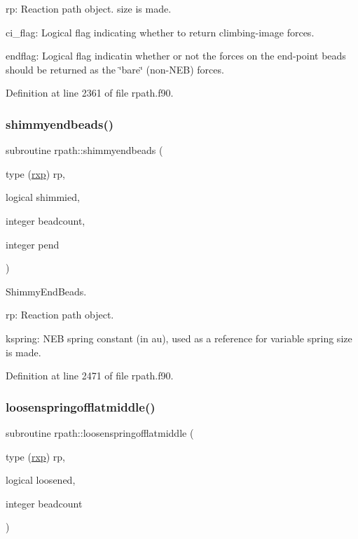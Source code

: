 \begin{DoxyItemize}
\item rp\+: Reaction path object. size is made.
\item ci\+\_\+flag\+: Logical flag indicating whether to return climbing-\/image forces.
\item endflag\+: Logical flag indicatin whether or not the forces on the end-\/point beads should be returned as the \char`\"{}bare\char`\"{} (non-\/\+N\+EB) forces. 
\end{DoxyItemize}

Definition at line 2361 of file rpath.\+f90.

\mbox{\label{namespacerpath_aae808f74fd2e658a175c79600c5bfe34}} 
\subsubsection{\texorpdfstring{shimmyendbeads()}{shimmyendbeads()}}
{\footnotesize\ttfamily subroutine rpath\+::shimmyendbeads (\begin{DoxyParamCaption}\item[{type (\mbox{\hyperlink{structrpath_1_1rxp}{rxp}})}]{rp,  }\item[{logical}]{shimmied,  }\item[{integer}]{beadcount,  }\item[{integer}]{pend }\end{DoxyParamCaption})}



Shimmy\+End\+Beads. 


\begin{DoxyItemize}
\item rp\+: Reaction path object.
\item kspring\+: N\+EB spring constant (in au), used as a reference for variable spring size is made. 
\end{DoxyItemize}

Definition at line 2471 of file rpath.\+f90.

\mbox{\label{namespacerpath_ae42b5c49527891229d00dfab8a17bd90}} 
\subsubsection{\texorpdfstring{loosenspringofflatmiddle()}{loosenspringofflatmiddle()}}
{\footnotesize\ttfamily subroutine rpath\+::loosenspringofflatmiddle (\begin{DoxyParamCaption}\item[{type (\mbox{\hyperlink{structrpath_1_1rxp}{rxp}})}]{rp,  }\item[{logical}]{loosened,  }\item[{integer}]{beadcount }\end{DoxyParamCaption})}



